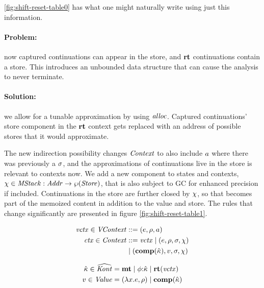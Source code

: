 \autoref{fig:shift-reset-table0} has what one might naturally write using just this information.
%
\paragraph{Problem:} now captured continuations can appear in the store, and $\mathbf{rt}$ continuations contain a store.
%
This introduces an unbounded data structure that can cause the analysis to never terminate.

\paragraph{Solution:} we allow for a tunable approximation by using $\mathit{alloc}$.
%
Captured continuations' store component in the $\mathbf{rt}$ context gets replaced with an address of possible stores that it would approximate.
 
The new indirection possibility changes $\mathit{Context}$ to also include $a$ where there was previously a $\sigma$, and the approximations of continuations live in the store is relevant to contexts now.
%
We add a new component to states and contexts, $\chi \in \mathit{MStack} : \mathit{Addr} \to \wp(\mathit{Store})$, that is also subject to GC for enhanced precision if included.
%
Continuations in the store are further closed by $\chi$, so that becomes part of the memoized content in addition to the value and store.
%
The rules that change significantly are presented in figure \ref{fig:shift-reset-table1}.

\begin{center}
  \begin{minipage}{0.50\linewidth}
    \begin{align*}
      \mathit{vctx} \in \mathit{VContext} &::= (e,\rho,a) \\
      \mathit{ctx} \in \mathit{Context} &::= \mathit{vctx} \mathrel{\mid}
      (e,\rho,\sigma,\chi) \\ &\mathrel{\mid} (\mathbf{comp}(\hat{\kappa}),
      v, \sigma, \chi)
    \end{align*}
  \end{minipage}
  \begin{minipage}{0.45\linewidth}
    \begin{align*}
      \hat{\kappa} \in \widehat{\mathit{Kont}} &= \mathbf{mt} \mathrel{\mid} \phi{\tt :} \hat{\kappa} \mathrel{\mid} \mathbf{rt}(\mathit{vctx}) \\
      v \in \mathit{Value} &= (\lambda{} x. e, \rho) \mathrel{\mid}
      \mathbf{comp}(\hat{\kappa})
    \end{align*}
  \end{minipage}
\end{center}

